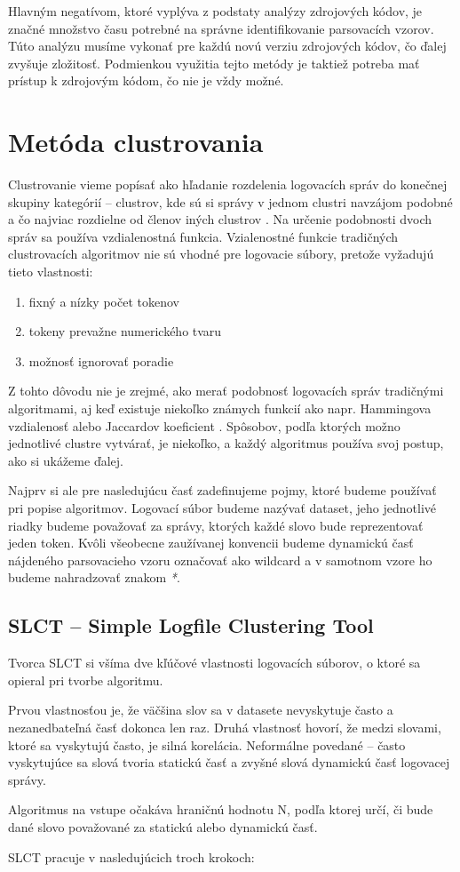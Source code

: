 Hlavným negatívom, ktoré vyplýva z podstaty analýzy zdrojových kódov, je značné množstvo času potrebné na správne identifikovanie parsovacích vzorov. Túto analýzu musíme vykonať pre každú novú verziu zdrojových kódov, čo ďalej zvyšuje zložitosť. Podmienkou využitia tejto metódy je taktiež potreba mať prístup k zdrojovým kódom, čo nie je vždy možné. 

\section{ Metóda clustrovania}

Clustrovanie vieme popísať ako hľadanie rozdelenia logovacích správ do konečnej skupiny kategórií -- clustrov, kde sú si správy v jednom clustri navzájom podobné a čo najviac rozdielne od členov iných clustrov  \parencite{iplom}. Na určenie podobnosti dvoch správ sa používa vzdialenostná funkcia. Vzialenostné funkcie tradičných clustrovacích algoritmov nie sú vhodné pre logovacie súbory, pretože vyžadujú tieto vlastnosti:

\begin{enumerate}
  \item fixný a nízky počet tokenov
  \item tokeny prevažne numerického tvaru
  \item možnosť ignorovať poradie
\end{enumerate}

Z tohto dôvodu nie je zrejmé, ako merať podobnosť logovacích správ tradičnými algoritmami, aj keď existuje niekoľko známych funkcií ako napr. Hammingova vzdialenosť alebo Jaccardov koeficient \parencite{slct}. Spôsobov, podľa ktorých možno jednotlivé clustre vytvárať, je niekoľko, a každý algoritmus používa svoj postup, ako si ukážeme ďalej. 
\par Najprv si ale pre nasledujúcu časť zadefinujeme pojmy, ktoré budeme používať pri popise algoritmov. Logovací súbor budeme nazývať dataset, jeho jednotlivé riadky budeme považovať za správy, ktorých každé slovo bude reprezentovať jeden token. Kvôli všeobecne zaužívanej konvencii budeme dynamickú časť nájdeného parsovacieho vzoru označovať ako wildcard a v samotnom vzore ho budeme nahradzovať znakom \emph{*}.

\subsection{SLCT -- Simple Logfile Clustering Tool}
Tvorca SLCT \parencite{slct, slctloghound} si všíma dve kľúčové vlastnosti logovacích súborov, o ktoré sa opieral pri tvorbe algoritmu. \par Prvou vlastnosťou je, že väčšina slov sa v datasete nevyskytuje často a nezanedbateľná časť dokonca len raz. Druhá vlastnosť hovorí, že medzi slovami, ktoré sa vyskytujú často, je silná korelácia. Neformálne povedané -- často vyskytujúce sa slová tvoria statickú časť a zvyšné slová dynamickú časť logovacej správy. 
\par Algoritmus na vstupe očakáva hraničnú hodnotu N, podľa ktorej určí, či bude dané slovo považované za statickú alebo dynamickú časť. 
\par SLCT pracuje v nasledujúcich troch krokoch:

